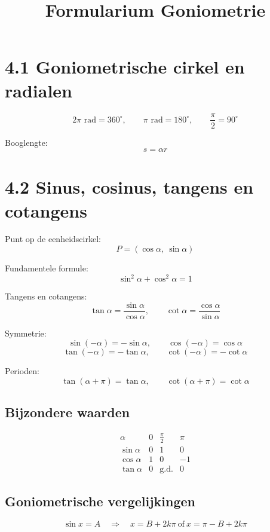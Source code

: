 \documentclass[a4paper,12pt]{article}
\title{Formularium Goniometrie}
\author{}
\date{}
\begin{document}
\maketitle

\section*{4.1 Goniometrische cirkel en radialen}

\[
2\pi \text{ rad} = 360^\circ,\qquad
\pi \text{ rad} = 180^\circ,\qquad
\frac{\pi}{2} = 90^\circ
\]

Booglengte:
\[
s = \alpha r
\]

\section*{4.2 Sinus, cosinus, tangens en cotangens}

Punt op de eenheidscirkel:
\[
P=(\cos \alpha,\ \sin \alpha)
\]

Fundamentele formule:
\[
\sin^2 \alpha + \cos^2 \alpha = 1
\]

Tangens en cotangens:
\[
\tan\alpha = \frac{\sin\alpha}{\cos\alpha},\qquad
\cot\alpha = \frac{\cos\alpha}{\sin\alpha}
\]

Symmetrie:
\[
\sin(-\alpha)=-\sin\alpha,\qquad
\cos(-\alpha)=\cos\alpha
\]
\[
\tan(-\alpha)=-\tan\alpha,\qquad
\cot(-\alpha)=-\cot\alpha
\]

Perioden:
\[
\tan(\alpha+\pi)=\tan\alpha,\qquad
\cot(\alpha+\pi)=\cot\alpha
\]

\subsection*{Bijzondere waarden}

\[
\begin{array}{c|ccc}
\alpha & 0 & \frac{\pi}{2} & \pi \\ \hline
\sin\alpha & 0 & 1 & 0 \\
\cos\alpha & 1 & 0 & -1 \\
\tan\alpha & 0 & \text{g.d.} & 0
\end{array}
\]

\subsection*{Goniometrische vergelijkingen}

\[
\sin x=A \quad\Rightarrow\quad
x = B + 2k\pi \ \text{of}\ x=\pi - B + 2k\pi
\]
\end{document}
